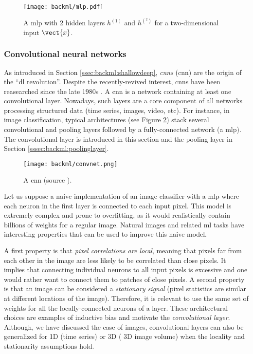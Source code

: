 \begin{figure}
  \centering
  \texttt{[image: backml/mlp.pdf]}
  \caption{A \acrlong{mlp} with 2 hidden layers $h^{(1)}$ and $h^{(^2)}$ for a two-dimensional input $\vect{x}$.}
  \label{fig:backml:mlp}
\end{figure}

\subsubsection{Convolutional neural networks}
\label{sssec:backml:dl:cnn}

As introduced in Section \ref{ssec:backml:shallowdeep}, \textit{\acrlong{cnn}s}
(\acrshort{cnn}) are the origin of the ``\acrlong{dl} revolution''. Despite the
recently-revived interest, \acrshort{cnn}s have been reasearched since the late
1980s \parencite{lecun1989handwritten}. A \acrshort{cnn} is a network containing
at least one convolutional layer. Nowadays, such layers are a core component of
all networks processing structured data (time series, images, video, etc). For
instance, in image classification, typical architectures (see Figure \ref{fig:backml:cnn})
stack several convolutional and pooling layers followed by a fully-connected
network (\ie a \acrshort{mlp}). The convolutional layer is introduced in this section and the pooling layer in Section \ref{sssec:backml:poolinglayer}.

\begin{figure}
 \centering
 \texttt{[image: backml/convnet.png]}
 \caption{A \acrlong{cnn} (source \parencite{millar2019using}).}
 \label{fig:backml:cnn}
\end{figure}

Let us suppose a naive implementation of an image classifier with a \acrshort{mlp}
where each neuron in the first layer is connected to each input pixel. This model
is extremely complex and prone to overfitting, as it would realistically contain
billions of weights for a regular image. Natural images and related \acrlong{ml}
tasks have interesting properties that can be used to improve this naive model.

A first property is that \textit{pixel correlations are local}, meaning that pixels
far from each other in the image are less likely to be correlated than close
pixels. It implies that connecting individual neurons to all input pixels is
excessive and one would rather want to connect them to patches of close pixels.
A second property is that an image can be considered a \textit{stationary signal}
(\ie pixel statistics are similar at different locations of the image). Therefore,
it is relevant to use the same set of weights for all the locally-connected neurons
of a layer. These architectural choices are examples of inductive bias and motivate
the \textit{convolutional layer}. Although, we have discussed the case of images,
convolutional layers can also be generalized for 1D (\eg time series) or 3D (\eg
3D image volume) when the locality and stationarity assumptions hold.

